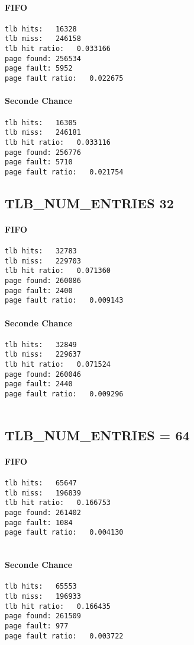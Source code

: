 \documentclass{article}
\begin{document}
\paragraph{FIFO}
\begin{lstlisting}
tlb hits:   16328
tlb miss:   246158
tlb hit ratio:   0.033166
page found: 256534
page fault: 5952
page fault ratio:   0.022675
\end{lstlisting}
\paragraph{Seconde Chance}
\begin{lstlisting}
tlb hits:   16305
tlb miss:   246181
tlb hit ratio:   0.033116
page found: 256776
page fault: 5710
page fault ratio:   0.021754
\end{lstlisting}
\subsection*{TLB_NUM_ENTRIES   32}
\paragraph{FIFO}
\begin{lstlisting}
tlb hits:   32783
tlb miss:   229703
tlb hit ratio:   0.071360
page found: 260086
page fault: 2400
page fault ratio:   0.009143
\end{lstlisting}
\paragraph{Seconde Chance}
\begin{lstlisting}
tlb hits:   32849
tlb miss:   229637
tlb hit ratio:   0.071524
page found: 260046
page fault: 2440
page fault ratio:   0.009296


\end{lstlisting}
\subsection*{TLB_NUM_ENTRIES = 64}
\paragraph{FIFO}
\begin{lstlisting}
tlb hits:   65647
tlb miss:   196839
tlb hit ratio:   0.166753
page found: 261402
page fault: 1084
page fault ratio:   0.004130


\end{lstlisting}
\paragraph{Seconde Chance}
\begin{lstlisting}
tlb hits:   65553
tlb miss:   196933
tlb hit ratio:   0.166435
page found: 261509
page fault: 977
page fault ratio:   0.003722


\end{lstlisting}
\end{document}
